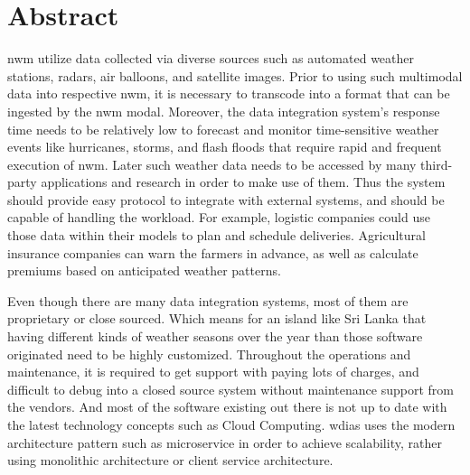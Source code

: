 \documentclass[a4paper,oneside,12pt]{report}
\begin{document}
{ 
\chapter*{Abstract}

\acrfull{nwm} utilize data collected via diverse sources such as automated weather stations, radars, air balloons, and satellite images. Prior to using such multimodal data into respective \acrshort{nwm}, it is necessary to transcode into a format that can be ingested by the \acrshort{nwm} modal. Moreover, the data integration system's response time needs to be relatively low to forecast and monitor time-sensitive weather events like hurricanes, storms, and flash floods that require rapid and frequent execution of \acrshort{nwm}. Later such weather data needs to be accessed by many third-party applications and research in order to make use of them. Thus the system should provide easy protocol to integrate with external systems, and should be capable of handling the workload. For example, logistic companies could use those data within their models to plan and schedule deliveries. Agricultural insurance companies can warn the farmers in advance, as well as calculate premiums based on anticipated weather patterns.

Even though there are many data integration systems, most of them are proprietary or close sourced. Which means for an island like Sri Lanka that having different kinds of weather seasons over the year than those software originated need to be highly customized. Throughout the operations and maintenance, it is required to get support with paying lots of charges, and difficult to debug into a closed source system without maintenance support from the vendors. And most of the software existing out there is not up to date with the latest technology concepts such as Cloud Computing. \acrfull{wdias} uses the modern architecture pattern such as microservice in order to achieve scalability, rather using monolithic architecture or client service architecture.

}
\end{document}
